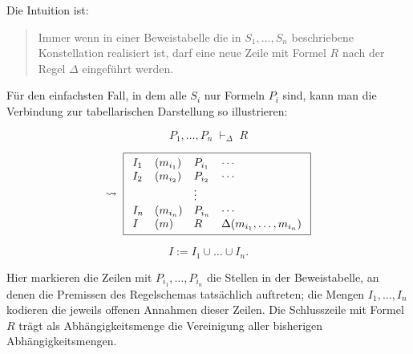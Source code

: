 \documentclass[main.tex]{subfiles}
\begin{document}
Die Intuition ist:
\begin{quote}
  Immer wenn in einer Beweistabelle die in \(S_1,\dots,S_n\) beschriebene
  Konstellation realisiert ist, darf eine neue Zeile mit Formel \(R\)
  nach der Regel \(\Delta\) eingeführt werden.
\end{quote}

Für den einfachsten Fall, in dem alle \(S_i\) nur Formeln \(P_i\) sind,
kann man die Verbindung zur tabellarischen Darstellung so illustrieren:

\begin{RuleSchema}
\[
P_1,\dots,P_n \;\vdash_\Delta\; R
\]

\[
\leadsto\;
\boxed{%
  \begin{array}{llll}
    I_1&(m_{i_1})&P_{i_1}&\cdots \\
    I_2&(m_{i_2})&P_{i_2}&\cdots \\
       &        &\vdots  &        \\
    I_n&(m_{i_n})&P_{i_n}&\cdots \\
    I  &(m)      &R      &\Delta(m_{i_1},\dots,m_{i_n}) \\
  \end{array}
}
\]

\[
I := I_1 \cup \dots \cup I_n.
\]
\end{RuleSchema}

Hier markieren die Zeilen mit \(P_{i_1},\dots,P_{i_n}\) die Stellen in
der Beweistabelle, an denen die Premissen des Regelschemas tatsächlich
auftreten; die Mengen \(I_1,\dots,I_n\) kodieren die jeweils offenen
Annahmen dieser Zeilen. Die Schlusszeile mit Formel \(R\) trägt als
Abhängigkeitsmenge die Vereinigung aller bisherigen Abhängigkeitsmengen.
\end{document}
